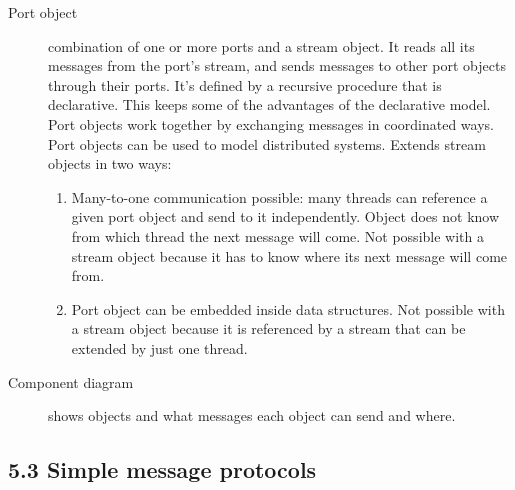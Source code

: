 \begin{description}
  \item[Port object] combination of one or more ports and a stream object.
    It reads all its messages from the port's stream, and sends messages to other port objects through their ports.
    It's defined by a recursive procedure that is declarative.
    This keeps some of the advantages of the declarative model.
    Port objects work together by exchanging messages in coordinated ways.
    Port objects can be used to model distributed systems.
    Extends stream objects in two ways:
    \begin{enumerate}
      \item Many-to-one communication possible: many threads can reference a given port object and send to it independently.
        Object does not know from which thread the next message will come.
        Not possible with a stream object because it has to know where its next message will come from.
      \item Port object can be embedded inside data structures.
        Not possible with a stream object because it is referenced by a stream that can be extended by just one thread.
    \end{enumerate}
  \item[Component diagram] shows objects and what messages each object can send and where.
\end{description}

\subsection{5.3 Simple message protocols}

